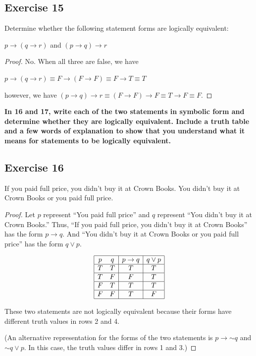\documentclass[14pt]{extarticle}
\begin{document}
\subsection{Exercise 15}
Determine whether the following statement forms are logically equivalent:

$p \to (q \to r)$ and $(p \to q) \to r$

\begin{proof}
No. When all three are false, we have

$p \to (q \to r) \equiv F \to (F \to F) \equiv F \to T \equiv T$

however, we have $(p \to q) \to r \equiv (F \to F) \to F \equiv T \to F \equiv
F$.
\end{proof}

{\bf In 16 and 17, write each of the two statements in symbolic form and
determine whether they are logically equivalent. Include a truth table and a few
words of explanation to show that you understand what it means for statements to
be logically equivalent.}

\subsection{Exercise 16}
If you paid full price, you didn’t buy it at Crown Books. You didn’t buy it at
Crown Books or you paid full price.

\begin{proof}
Let $p$ represent “You paid full price” and $q$ represent “You didn’t buy it at
Crown Books.” Thus, “If you paid full price, you didn’t buy it at Crown Books”
has the form $p \to q$. And “You didn’t buy it at Crown Books or you paid full
price” has the form $q \vee p$.

$$
\begin{array}{|cc|c|c|}
\hline
p & q & p \to q & q \vee p \\
\hline
T & T & T & T \\
\hline
T & F & F & T \\
\hline
F & T & T & T \\
\hline
F & F & T & F \\
\hline
\end{array}
$$

These two statements are not logically equivalent because their forms have
different truth values in rows 2 and 4.

(An alternative representation for the forms of the two statements is $p \to
{\sim q}$ and ${\sim q} \vee p$. In this case, the truth values differ in rows 1
and 3.)
\end{proof}
\end{document}
